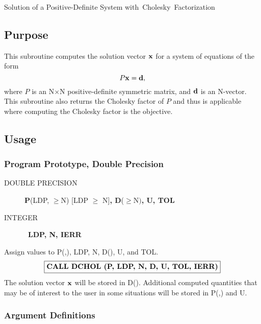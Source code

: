 \documentclass[twoside]{MATH77}
\begin{document}
 Solution of a Positive-Definite System \hbox{with Cholesky Factorization}


\subsection{Purpose}

This subroutine computes the solution vector ${\bf x}$ for a system of
equations of the form
\begin{equation}
\label{O1}P{\bf x}={\bf d},
\end{equation}
where $P$ is an N$\times $N positive-definite symmetric matrix, and ${\bf d}$ is an
N-vector. This subroutine also returns the Cholesky factor of $P$ and thus is
applicable where computing the Cholesky factor is the objective.

\subsection{Usage}

\subsubsection{Program Prototype, Double Precision}

\begin{description}
\item[DOUBLE PRECISION]  {\bf P}(LDP, $\geq $N) [LDP $\geq $ N]{\bf , D}($%
\geq $N$)${\bf , U, TOL}

\item[INTEGER]  \ {\bf LDP, N, IERR}
\end{description}

Assign values to P(,), LDP, N, D(), U, and TOL.
$$
\fbox{{\bf CALL DCHOL (P, LDP, N, D, U, TOL, IERR)}}
$$
The solution vector ${\bf x}$ will be stored in D(). Additional computed
quantities that may be of interest to the user in some situations will be
stored in P(,) and U.

\subsubsection{Argument Definitions}
\end{document}
